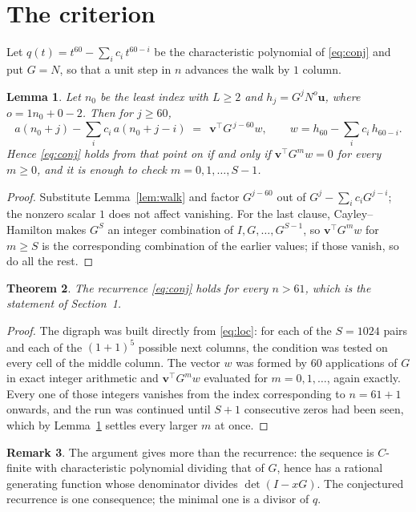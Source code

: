 \documentclass[11pt,a4paper]{article}
\theoremstyle{plain}
\newtheorem{theorem}{Theorem}
\newtheorem{lemma}[theorem]{Lemma}
\theoremstyle{definition}
\newtheorem{remark}[theorem]{Remark}
\begin{document}
\section{The criterion}

Let $q(t)=t^{60}-\sum_i c_i\,t^{60-i}$ be the characteristic polynomial of
\eqref{eq:conj} and put $G=N$, so that a unit step in $n$ advances the walk by
$1$ column.

\begin{lemma}\label{lem:crit}
Let $n_0$ be the least index with $L\ge2$ and $h_j=G^{j}N^{o}\mathbf{u}$, where
$o=1n_0+0-2$. Then for $j\ge60$,
\[
a(n_0+j)-\sum_i c_i\,a(n_0+j-i)\;=\;\,\mathbf{v}^{\!\top}G^{\,j-60}w,
\qquad w=h_{60}-\sum_i c_i\,h_{60-i} .
\]
Hence \eqref{eq:conj} holds from that point on if and only if
$\mathbf{v}^{\!\top}G^{m}w=0$ for every $m\ge0$, and it is enough to check
$m=0,1,\dots,S-1$.
\end{lemma}

\begin{proof}
Substitute Lemma~\ref{lem:walk} and factor $G^{j-60}$ out of
$G^{j}-\sum_ic_iG^{j-i}$; the nonzero scalar $1$ does not affect
vanishing. For the last clause, Cayley--Hamilton makes $G^{S}$ an integer combination of
$I,G,\dots,G^{S-1}$, so $\mathbf{v}^{\!\top}G^{m}w$ for $m\ge S$ is the corresponding
combination of the earlier values; if those vanish, so do all the rest.
\end{proof}

\begin{theorem}
The recurrence \eqref{eq:conj} holds for every $n>61$, which is the statement of
Section~1.
\end{theorem}

\begin{proof}
The digraph was built directly from \eqref{eq:loc}: for each of the $S=1024$ pairs and each
of the $(1+1)^{5}$ possible next columns, the condition was tested on every cell of
the middle column. The vector $w$ was formed by $60$ applications of $G$ in exact integer
arithmetic and $\mathbf{v}^{\!\top}G^{m}w$ evaluated for $m=0,1,\dots$, again exactly.
Every one of those integers vanishes from the index corresponding to $n=61+1$ onwards,
and the run was continued until $S+1$ consecutive zeros had been seen, which by
Lemma~\ref{lem:crit} settles every larger $m$ at once.
\end{proof}

\begin{remark}
The argument gives more than the recurrence: the sequence is $C$-finite with characteristic
polynomial dividing that of $G$, hence has a rational generating function whose denominator
divides $\det(I-xG)$. The conjectured recurrence is one consequence; the minimal one is a
divisor of $q$.
\end{remark}
\end{document}
